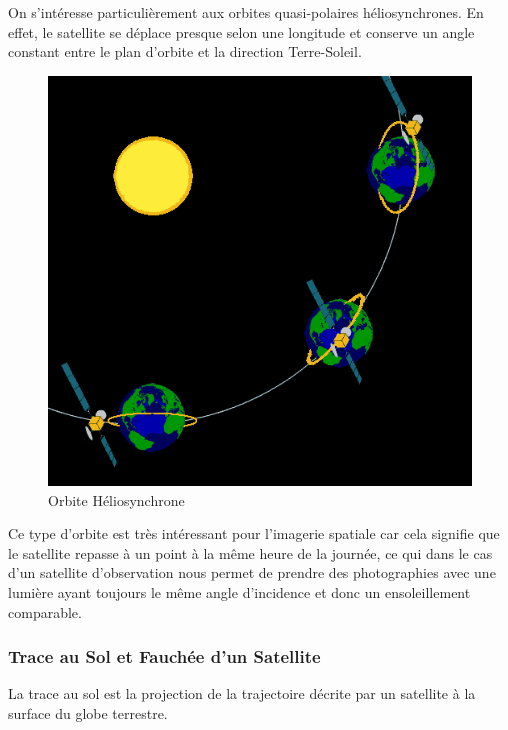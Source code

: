 \documentclass[a4paper, 11pt]{report}
\begin{document}
On s'intéresse particulièrement aux orbites quasi-polaires héliosynchrones. En effet, le satellite se déplace presque selon une longitude et conserve un angle constant entre le plan d'orbite et la direction Terre-Soleil.
\begin{figure}[H]
	\centering
	\includegraphics[scale=0.3]{Images/Orbite_Heliosynchrone.png}
	\caption{Orbite Héliosynchrone}
\end{figure}
Ce type d'orbite est très intéressant pour l'imagerie spatiale car cela signifie que le satellite repasse à un point à la même heure de la journée, ce qui dans le cas d'un satellite d'observation nous permet de prendre des photographies avec une lumière ayant toujours le même angle d'incidence et donc un ensoleillement comparable.
\subsubsection{Trace au Sol et Fauchée d'un Satellite}
La trace au sol est la projection de la trajectoire décrite par un satellite à la surface du globe terrestre.
\end{document}
